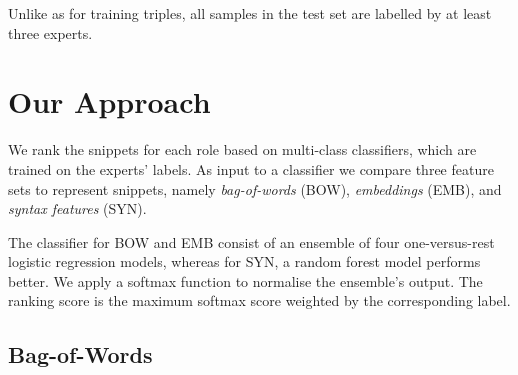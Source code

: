 Unlike as for training triples, all samples in the test set are labelled by at least three experts.


\section{Our Approach}
We rank the snippets for each role based on multi-class classifiers, which are trained on the experts' labels.
As input to a classifier we compare three feature sets to represent snippets, namely \emph{bag-of-words} (BOW), \emph{embeddings} (EMB), and \emph{syntax features} (SYN).

The classifier for BOW and EMB consist of an ensemble of four one-versus-rest logistic regression models, whereas for SYN, a random forest model performs better.
We apply a softmax function to normalise the ensemble's output. The ranking score is the maximum softmax score weighted by the corresponding label.
 



\subsection{Bag-of-Words}

